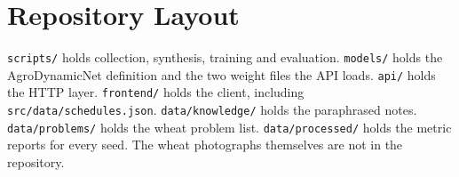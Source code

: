 \section{Repository Layout}
\texttt{scripts/} holds collection, synthesis, training and evaluation. \texttt{models/} holds the AgroDynamicNet definition and the two weight files the API loads. \texttt{api/} holds the HTTP layer. \texttt{frontend/} holds the client, including \texttt{src/data/schedules.json}. \texttt{data/knowledge/} holds the paraphrased notes. \texttt{data/problems/} holds the wheat problem list. \texttt{data/processed/} holds the metric reports for every seed. The wheat photographs themselves are not in the repository.
